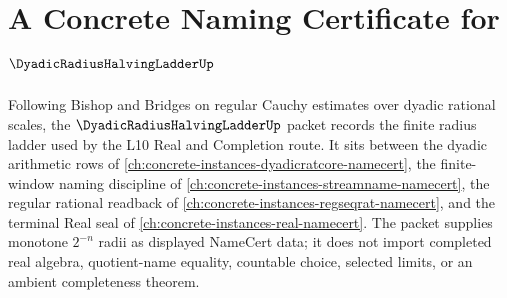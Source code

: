 \chapter{A Concrete Naming Certificate for $\DyadicRadiusHalvingLadderUp$}
\label{ch:concrete-instances-dyadic-radius-halving-ladder-namecert}

Following Bishop and Bridges on regular Cauchy estimates over dyadic rational scales, the $\DyadicRadiusHalvingLadderUp$ packet records the finite radius ladder used by the L10 Real and Completion route. It sits between the dyadic arithmetic rows of \autoref{ch:concrete-instances-dyadicratcore-namecert}, the finite-window naming discipline of \autoref{ch:concrete-instances-streamname-namecert}, the regular rational readback of \autoref{ch:concrete-instances-regseqrat-namecert}, and the terminal Real seal of \autoref{ch:concrete-instances-real-namecert}. The packet supplies monotone $2^{-n}$ radii as displayed NameCert data; it does not import completed real algebra, quotient-name equality, countable choice, selected limits, or an ambient completeness theorem.

